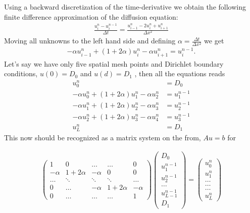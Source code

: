 \documentclass[11pt,a4paper,draft]{article}
\numberwithin{equation}{section}
\begin{document}
Using a backward discretization of the time-derivative we obtain the following finite difference approximation of the diffusion equation:
\begin{align*}
\frac{u_{i}^{n}-u_{i}^{n-1}}{\Delta t} = \frac{u_{i-1}^{n}-2u_{i}^{n}+u_{i+1}^{n}}{\Delta x^2}
\end{align*}
Moving all unknowns to the left hand side and defining $\alpha = \frac{\Delta t}{\Delta x^2}$ we get
\begin{align*}
-\alpha u_{i-1}^n + (1+2\alpha)u_i^n - \alpha u_{i+1}^n = u_i^{n-1}. 
\end{align*}
Let's say we have only five spatial mesh points and Dirichlet boundary conditions, $u(0)=D_0$ and $u(d)=D_1$ , then all the equations reads
\begin{align*}
u_0^n &= D_0 \\
-\alpha u_{0}^n + (1+2\alpha)u_1^n - \alpha u_{2}^n &= u_1^{n-1} \\
-\alpha u_{1}^n + (1+2\alpha)u_2^n - \alpha u_{3}^n &= u_2^{n-1} \\
-\alpha u_{2}^n + (1+2\alpha)u_3^n - \alpha u_{4}^n &= u_3^{n-1} \\
u_L^n &= D_1 
\end{align*}
This now should be recognized as a matrix system on the from, $Au=b$ for 

\begin{align*}
\begin{pmatrix} 1 & 0 & \dots   & \dots         & 0 \\
                -\alpha & 1+2\alpha & -\alpha & 0           &0 \\
        \dots  & \ddots & \ddots & \ddots         & \dots\\
 0   & \dots &  -\alpha & 1+2\alpha & -\alpha \\
 0   & \dots & \dots & \dots    &  1
             \end{pmatrix}
\begin{pmatrix} D_0 \\
      u_1^{n-1} \\
      u_2^{n-1}\\ \dots\\ u_{L-1}^{n-1}\\
      D_1
\end{pmatrix} 
=  \begin{pmatrix} u_0^n \\
                   u_1^n  \\
           \dots\\ \dots\\ \dots\\
                   u_L^n 
             \end{pmatrix} 
\end{align*} 
\end{document}
